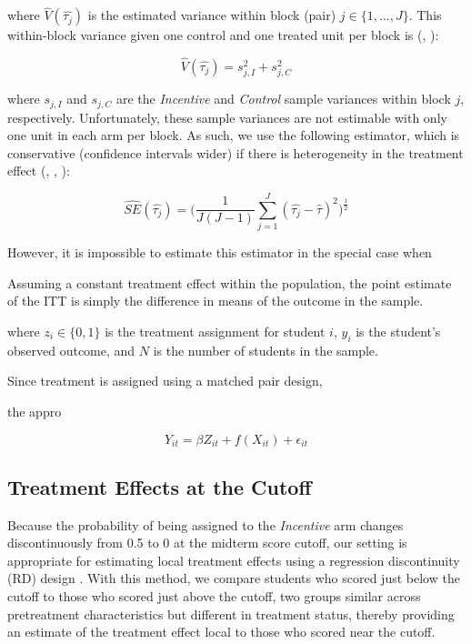 \documentclass[12pt]{article}
\begin{document}
where $\hat{V}(\hat{\tau_j})$ is the estimated variance within block (pair) $j\in \{1,...,J\}$. This within-block variance given one control and one treated unit per block is (\cite{ir2015}, \cite{ai2017}):

\begin{equation} \label{v_block}
	\hat{V}(\hat{\tau_j}) = s_{j, I}^2 + s_{j, C}^2
\end{equation}

where $s_{j, I}$ and $s_{j, C}$ are the \textit{Incentive} and \textit{Control} sample variances within block $j$, respectively. Unfortunately, these sample variances are not estimable with only one unit in each arm per block. As such, we use the following estimator, which is conservative (confidence intervals wider) if there is heterogeneity in the treatment effect (\cite{imai2008}, \cite{ai2015}, \cite{ai2017}):

\begin{equation} \label{se_imai}
	\hat{SE}(\hat{\tau_j}) = \Big(\frac{1}{J(J-1)}\sum_{j=1}^{J} (\hat{\tau_j} - \hat{\tau})^2 \Big)^\frac{1}{2}
\end{equation}

However, it is impossible to estimate this estimator in the special case when

Assuming a constant treatment effect within the population, the point estimate of the ITT is simply the difference in means of the outcome in the sample.



where $z_i \in \{0,1\}$ is the treatment assignment for student $i$, $y_i$ is the student's observed outcome, and $N$ is the number of students in the sample.

Since treatment is assigned using a matched pair design,

 the appro

\begin{equation}
	Y_{it} = \beta Z_{it} + f(X_{it}) + \epsilon_{it}
\end{equation}



\subsection{Treatment Effects at the Cutoff}

Because the probability of being assigned to the \textit{Incentive} arm changes discontinuously from 0.5 to 0 at the midterm score cutoff, our setting is appropriate for estimating local treatment effects using a regression discontinuity (RD) design \citep{tc1960, ap2008, il2008}. With this method, we compare students who scored just below the cutoff to those who scored just above the cutoff, two groups similar across pretreatment characteristics but different in treatment status, thereby providing an estimate of the treatment effect local to those who scored near the cutoff.
\end{document}
